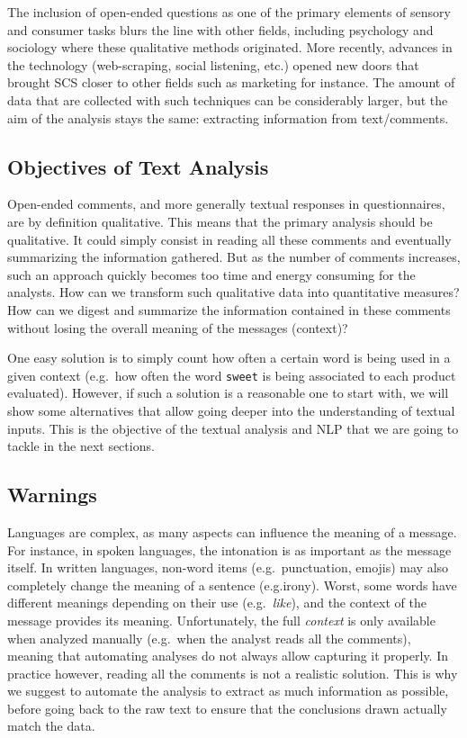 \documentclass[
]{book}
\begin{document}
The inclusion of open-ended questions as one of the primary elements of sensory and consumer tasks blurs the line with other fields, including psychology and sociology where these qualitative methods originated. More recently, advances in the technology (web-scraping, social listening, etc.) opened new doors that brought SCS closer to other fields such as marketing for instance. The amount of data that are collected with such techniques can be considerably larger, but the aim of the analysis stays the same: extracting information from text/comments.

\hypertarget{objectives-of-text-analysis}{%
\subsection{Objectives of Text Analysis}\label{objectives-of-text-analysis}}

Open-ended comments, and more generally textual responses in questionnaires, are by definition qualitative. This means that the primary analysis should be qualitative. It could simply consist in reading all these comments and eventually summarizing the information gathered. But as the number of comments increases, such an approach quickly becomes too time and energy consuming for the analysts. How can we transform such qualitative data into quantitative measures? How can we digest and summarize the information contained in these comments without losing the overall meaning of the messages (context)?

One easy solution is to simply count how often a certain word is being used in a given context (e.g.~how often the word \texttt{sweet} is being associated to each product evaluated). However, if such a solution is a reasonable one to start with, we will show some alternatives that allow going deeper into the understanding of textual inputs. This is the objective of the textual analysis and NLP that we are going to tackle in the next sections.

\hypertarget{warnings}{%
\subsection{Warnings}\label{warnings}}

Languages are complex, as many aspects can influence the meaning of a message. For instance, in spoken languages, the intonation is as important as the message itself. In written languages, non-word items (e.g.~punctuation, emojis) may also completely change the meaning of a sentence (e.g.irony). Worst, some words have different meanings depending on their use (e.g.~\emph{like}), and the context of the message provides its meaning. Unfortunately, the full \emph{context} is only available when analyzed manually (e.g.~when the analyst reads all the comments), meaning that automating analyses do not always allow capturing it properly. In practice however, reading all the comments is not a realistic solution. This is why we suggest to automate the analysis to extract as much information as possible, before going back to the raw text to ensure that the conclusions drawn actually match the data.
\end{document}

